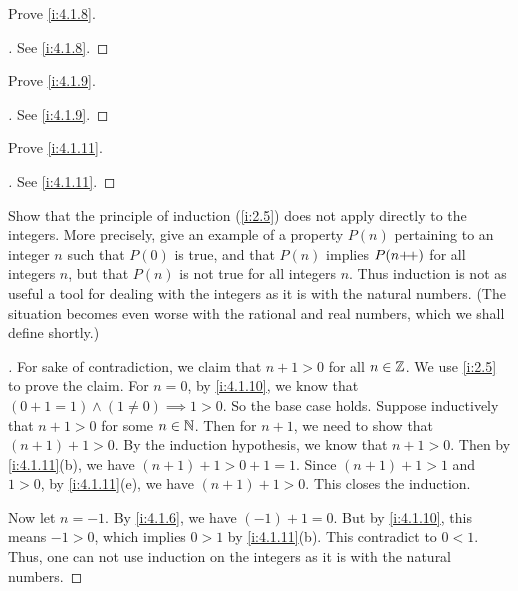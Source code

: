 \begin{ex}\label{i:ex:4.1.5}
  Prove \cref{i:4.1.8}.
\end{ex}

\begin{proof}[]
  See \cref{i:4.1.8}.
\end{proof}

\begin{ex}\label{i:ex:4.1.6}
  Prove \cref{i:4.1.9}.
\end{ex}

\begin{proof}[]
  See \cref{i:4.1.9}.
\end{proof}

\begin{ex}\label{i:ex:4.1.7}
  Prove \cref{i:4.1.11}.
\end{ex}

\begin{proof}[]
  See \cref{i:4.1.11}.
\end{proof}

\begin{ex}\label{i:ex:4.1.8}
  Show that the principle of induction (\cref{i:2.5}) does not apply directly to the integers.
  More precisely, give an example of a property \(P(n)\) pertaining to an integer \(n\) such that \(P(0)\) is true, and that \(P(n)\) implies \(P(n{+}\!{+})\) for all integers \(n\), but that \(P(n)\) is not true for all integers \(n\).
  Thus induction is not as useful a tool for dealing with the integers as it is with the natural numbers.
  (The situation becomes even worse with the rational and real numbers, which we shall define shortly.)
\end{ex}

\begin{proof}[]
  For sake of contradiction, we claim that \(n + 1 > 0\) for all \(n \in \mathbb{Z}\).
  We use \cref{i:2.5} to prove the claim.
  For \(n = 0\), by \cref{i:4.1.10}, we know that \((0 + 1 = 1) \land (1 \neq 0) \implies 1 > 0\).
  So the base case holds.
  Suppose inductively that \(n + 1 > 0\) for some \(n \in \mathbb{N}\).
  Then for \(n + 1\), we need to show that \((n + 1) + 1 > 0\).
  By the induction hypothesis, we know that \(n + 1 > 0\).
  Then by \cref{i:4.1.11}(b), we have \((n + 1) + 1 > 0 + 1 = 1\).
  Since \((n + 1) + 1 > 1\) and \(1 > 0\), by \cref{i:4.1.11}(e), we have \((n + 1) + 1 > 0\).
  This closes the induction.

  Now let \(n = -1\).
  By \cref{i:4.1.6}, we have \((-1) + 1 = 0\).
  But by \cref{i:4.1.10}, this means \(-1 > 0\), which implies \(0 > 1\) by \cref{i:4.1.11}(b).
  This contradict to \(0 < 1\).
  Thus, one can not use induction on the integers as it is with the natural numbers.
\end{proof}
